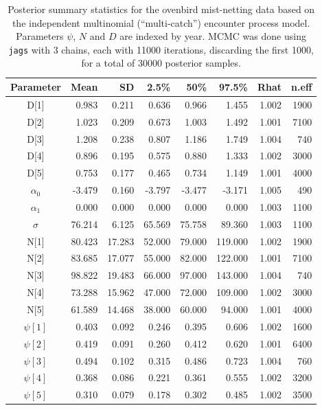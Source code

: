 \begin{table}[t!]
\centering
  \small
  \caption{Posterior summary statistics
for the ovenbird mist-netting data based on the
    independent multinomial (``multi-catch'') encounter process
    model. Parameters $\psi$, $N$ and $D$ are indexed by
    year.
MCMC was done using
    {\tt jags} with 3 chains, each with 11000 iterations, discarding
    the first 1000, for a total of 30000 posterior samples.}
  \begin{tabular}[t]{crrrrrrr}
    \hline \hline
Parameter   &  Mean &  SD &  2.5\%  &  50\%  &  97.5\%  & Rhat &  n.eff \\    \hline
D[1]   &  0.983 &  0.211 & 0.636 &  0.966 &   1.455& 1.002 & 1900\\
D[2]   &  1.023 &  0.209 & 0.673 &  1.003 &   1.492& 1.001 & 7100\\
D[3]   &  1.208 &  0.238 & 0.807 &  1.186 &   1.749& 1.004 &  740\\
D[4]   &  0.896 &  0.195 & 0.575 &  0.880 &   1.333& 1.002 & 3000\\
D[5]   &  0.753 &  0.177 & 0.465 &  0.734 &   1.149& 1.001 & 4000\\
$\alpha_0$ & -3.479 &  0.160 &-3.797 & -3.477 &  -3.171& 1.005 &  490\\
$\alpha_1$ &  0.000 &  0.000 & 0.000 &  0.000 &   0.000& 1.003 & 1100\\
$\sigma$  & 76.214 &  6.125 &65.569 & 75.758 &  89.360& 1.003 & 1100\\
N[1]   & 80.423 & 17.283 &52.000 &79.000  &119.000 &1.002  &1900\\
N[2]   & 83.685 & 17.077 &55.000 & 82.000 & 122.000& 1.001 & 7100\\
N[3]   & 98.822 & 19.483 &66.000 & 97.000 & 143.000& 1.004 &  740\\
N[4]   & 73.288 & 15.962 &47.000 & 72.000 & 109.000& 1.002 & 3000\\
N[5]   & 61.589 & 14.468 &38.000 & 60.000 &  94.000& 1.001 & 4000\\
$\psi[1]$ &  0.403 &  0.092 & 0.246 &  0.395 &   0.606& 1.002 & 1600\\
$\psi[2]$ &  0.419 &  0.091 & 0.260 &  0.412 &   0.620& 1.001 & 6400\\
$\psi[3]$ &  0.494 &  0.102 & 0.315 &  0.486 &   0.723& 1.004 &  760\\
$\psi[4]$ &  0.368 &  0.086 & 0.221 &  0.361 &   0.555& 1.002 & 3200\\
$\psi[5]$ &  0.310 &  0.079 & 0.178 &  0.302 &   0.485& 1.002 & 3500\\
\hline
  \end{tabular}
  \label{scrovenbird.results}
\end {table}








